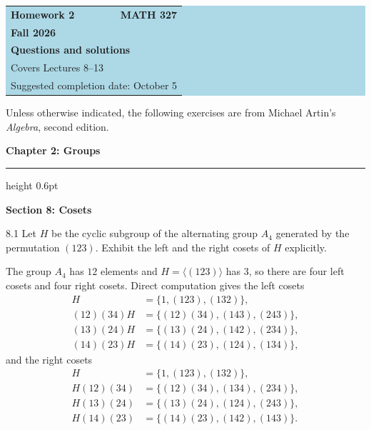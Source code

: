 \documentclass[11pt]{article}
\newcommand{\chapterheading}[1]{%
  \par\vspace{0.5em}
  {\color{courseblue}\Large\bfseries #1}\par\vspace{0.35em}
  {\color{boxborder}\hrule height 0.6pt}\vspace{0.35em}
}
\newcommand{\sectionheading}[1]{%
  \Needspace{8\baselineskip}
  \vspace{0.25em}
  {\color{darkgray}\large\bfseries #1}\par
}
\begin{document}
\begin{center}
  \colorbox{lightblue}{%
    \begin{minipage}{0.92\textwidth}
      \vspace{0.6em}
      \begin{tabular*}{\textwidth}{@{\extracolsep{\fill}}lr}
        {\color{courseblue}\bfseries\LARGE Homework 2} &
        {\color{courseblue}\bfseries\LARGE MATH 327}\\[0.4em]
        \multicolumn{2}{l}{\color{darkgray}\bfseries Fall 2026}\\[0.35em]
        \multicolumn{2}{l}{\color{courseblue}\bfseries Questions and solutions}\\[0.35em]
        \multicolumn{2}{l}{\color{darkgray}Covers Lectures 8--13}\\[0.2em]
        \multicolumn{2}{l}{\color{darkgray}Suggested completion date: October 5}
      \end{tabular*}
      \vspace{0.5em}
    \end{minipage}}
\end{center}

\vspace{0.5em}

Unless otherwise indicated, the following exercises are from Michael Artin's
\emph{Algebra}, second edition.


\chapterheading{Chapter 2: Groups}

\sectionheading{Section 8: Cosets}

\begin{exercise}{8.1}
Let $H$ be the cyclic subgroup of the alternating group $A_4$ generated
by the permutation $(123)$. Exhibit the left and the right cosets of $H$
explicitly.
\end{exercise}

\begin{solution}
The group $A_4$ has $12$ elements and $H=\langle(123)\rangle$ has $3$,
so there are four left cosets and four right cosets. Direct computation gives
the left cosets
\begin{align*}
  H&=\{1,(123),(132)\},\\
  (12)(34)H&=\{(12)(34),(143),(243)\},\\
  (13)(24)H&=\{(13)(24),(142),(234)\},\\
  (14)(23)H&=\{(14)(23),(124),(134)\},
\end{align*}
and the right cosets
\begin{align*}
  H&=\{1,(123),(132)\},\\
  H(12)(34)&=\{(12)(34),(134),(234)\},\\
  H(13)(24)&=\{(13)(24),(124),(243)\},\\
  H(14)(23)&=\{(14)(23),(142),(143)\}.
\end{align*}
\end{solution}
\end{document}
